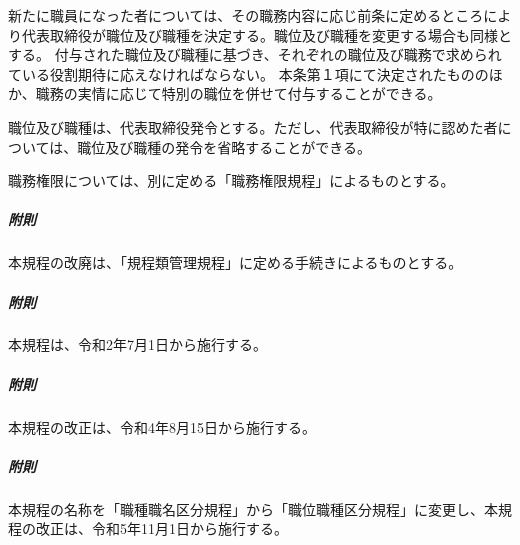 \documentclass[10pt,a4paper,uplatex]{jsarticle}
\begin{document}
新たに職員になった者については、その職務内容に応じ前条に定めるところにより代表取締役が職位及び職種を決定する。職位及び職種を変更する場合も同様とする。
\term 付与された職位及び職種に基づき、それぞれの職位及び職務で求められている役割期待に応えなければならない。
\term 本条第１項にて決定されたもののほか、職務の実情に応じて特別の職位を併せて付与することができる。

職位及び職種は、代表取締役発令とする。ただし、代表取締役が特に認めた者については、職位及び職種の発令を省略することができる。

職務権限については、別に定める「職務権限規程」によるものとする。

\vspace{1cm}
\subparagraph{附則}本規程の改廃は、「規程類管理規程」に定める手続きによるものとする。
\subparagraph{附則}本規程は、令和2年7月1日から施行する。
\subparagraph{附則}本規程の改正は、令和4年8月15日から施行する。
\subparagraph{附則}本規程の名称を「職種職名区分規程」から「職位職種区分規程」に変更し、本規程の改正は、令和5年11月1日から施行する。

\end{document}
